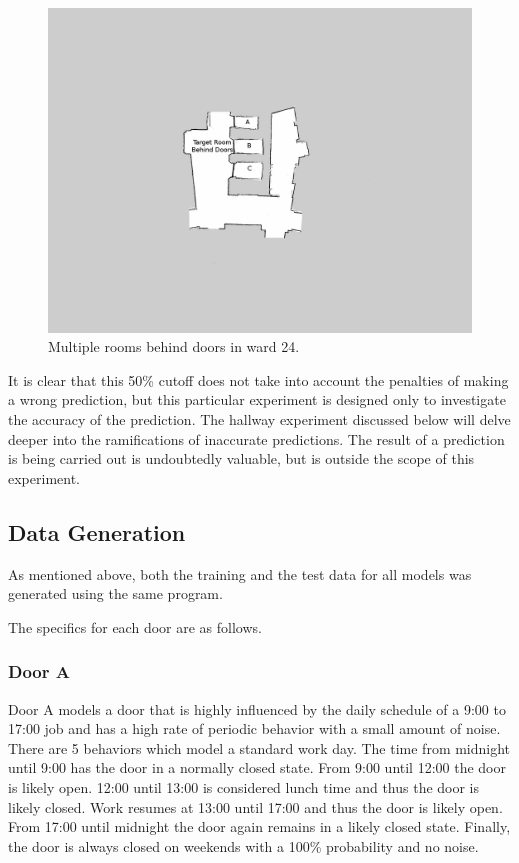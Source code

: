   \begin{figure}[!htb]
    \centering
    \includegraphics[width=\linewidth]{images/ward_24_door.png}
    \caption{Multiple rooms behind doors in ward 24.}
    \label{figure:ward_24_door}
  \end{figure}

  It is clear that this 50\% cutoff does not take into account the penalties
  of making a wrong prediction, but this particular experiment is designed only to
  investigate the accuracy of the prediction. The hallway experiment discussed
  below will delve deeper into the ramifications of inaccurate
  predictions. The result of a prediction is
  being carried out is undoubtedly valuable, but is outside the scope of this
  experiment. \\

  \subsection{ Data Generation }

  As mentioned above, both the training and the test data for all models was
  generated using the same program.

  The specifics for each door are as follows.

  \subsubsection{ Door A }

  Door A models a door that is highly influenced by the daily schedule of a
  9:00 to 17:00 job and has a high rate of periodic behavior with a small
  amount of noise. There are 5 behaviors which model a standard work day. The
  time from midnight until 9:00 has the door in a normally closed
  state. From 9:00 until 12:00 the door is likely open. 12:00 until 13:00 is
  considered lunch time and thus the door is likely closed. Work resumes at
  13:00 until 17:00 and thus the door is likely open. From 17:00 until midnight
  the door again remains in a likely closed state. Finally, the door is always
  closed on weekends with a 100\% probability and no noise. \\

